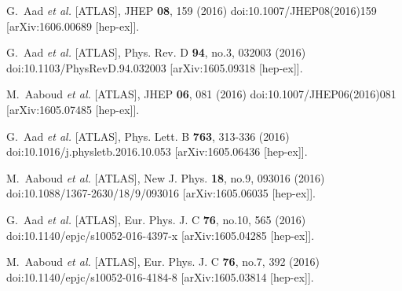 \begin{thebibliography}{9}
G.~Aad \textit{et al.} [ATLAS],
JHEP \textbf{08}, 159 (2016)
doi:10.1007/JHEP08(2016)159
[arXiv:1606.00689 [hep-ex]].

G.~Aad \textit{et al.} [ATLAS],
Phys. Rev. D \textbf{94}, no.3, 032003 (2016)
doi:10.1103/PhysRevD.94.032003
[arXiv:1605.09318 [hep-ex]].

M.~Aaboud \textit{et al.} [ATLAS],
JHEP \textbf{06}, 081 (2016)
doi:10.1007/JHEP06(2016)081
[arXiv:1605.07485 [hep-ex]].

G.~Aad \textit{et al.} [ATLAS],
Phys. Lett. B \textbf{763}, 313-336 (2016)
doi:10.1016/j.physletb.2016.10.053
[arXiv:1605.06436 [hep-ex]].

M.~Aaboud \textit{et al.} [ATLAS],
New J. Phys. \textbf{18}, no.9, 093016 (2016)
doi:10.1088/1367-2630/18/9/093016
[arXiv:1605.06035 [hep-ex]].

G.~Aad \textit{et al.} [ATLAS],
Eur. Phys. J. C \textbf{76}, no.10, 565 (2016)
doi:10.1140/epjc/s10052-016-4397-x
[arXiv:1605.04285 [hep-ex]].

M.~Aaboud \textit{et al.} [ATLAS],
Eur. Phys. J. C \textbf{76}, no.7, 392 (2016)
doi:10.1140/epjc/s10052-016-4184-8
[arXiv:1605.03814 [hep-ex]].


\end{thebibliography}
